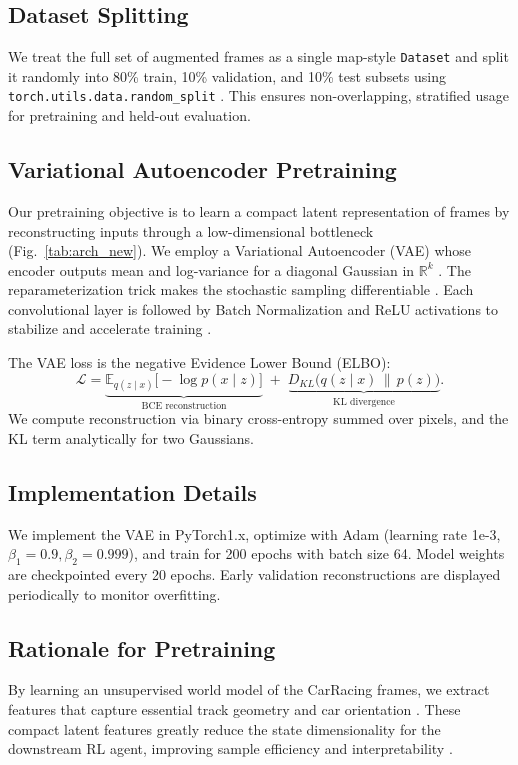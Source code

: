 \documentclass[12pt]{article}
\begin{document}
\subsection{Dataset Splitting}
We treat the full set of augmented frames as a single map-style \texttt{Dataset} and split it randomly into 80\% train, 10\% validation, and 10\% test subsets using \texttt{torch.utils.data.random\_split} \cite{torch.utils.data}. This ensures non-overlapping, stratified usage for pretraining and held-out evaluation.

\subsection{Variational Autoencoder Pretraining}
Our pretraining objective is to learn a compact latent representation of frames by reconstructing inputs through a low-dimensional bottleneck (Fig.~\ref{tab:arch_new}).  We employ a Variational Autoencoder (VAE) whose encoder outputs mean and log-variance for a diagonal Gaussian in \(\mathbb{R}^k\) \cite{kingma_auto-encoding_2013}.  The reparameterization trick makes the stochastic sampling differentiable \cite{kingma_auto-encoding_2013}.  Each convolutional layer is followed by Batch Normalization and ReLU activations to stabilize and accelerate training \cite{ioffe_batch_2015}.

The VAE loss is the negative Evidence Lower Bound (ELBO):
\[
\mathcal{L} = \underbrace{\mathbb{E}_{q(z\mid x)}\bigl[-\log p(x\mid z)\bigr]}_{\text{BCE reconstruction}} \;+\; \underbrace{D_{KL}\bigl(q(z\mid x)\,\|\,p(z)\bigr)}_{\text{KL divergence}}.
\]
We compute reconstruction via binary cross-entropy summed over pixels, and the KL term analytically for two Gaussians.

\subsection{Implementation Details}
We implement the VAE in PyTorch1.x, optimize with Adam (learning rate 1e-3, \(\beta_1=0.9,\beta_2=0.999\)), and train for 200 epochs with batch size 64.  Model weights are checkpointed every 20 epochs.  Early validation reconstructions are displayed periodically to monitor overfitting.

\subsection{Rationale for Pretraining}
By learning an unsupervised world model of the CarRacing frames, we extract features that capture essential track geometry and car orientation \cite{ha_world_2018}. These compact latent features greatly reduce the state dimensionality for the downstream RL agent, improving sample efficiency and interpretability \cite{white_sampling_2016}.
\end{document}
